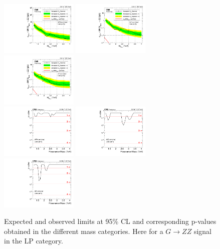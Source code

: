 \begin{figure}[h!]
\centering
\includegraphics[width=0.327\textwidth]{figures/analysis/search1/AN-15-211/limits/brazilianFlag_BulkZZ_WWLP_13TeV_wPDF.pdf}
\includegraphics[width=0.327\textwidth]{figures/analysis/search1/AN-15-211/limits/brazilianFlag_BulkZZ_WZLP_13TeV_wPDF.pdf}
\includegraphics[width=0.327\textwidth]{figures/analysis/search1/AN-15-211/limits/brazilianFlag_BulkZZ_ZZLP_13TeV_wPDF.pdf}\\
\includegraphics[width=0.327\textwidth]{figures/analysis/search1/AN-15-211/pvalues/pvalue_BulkZZinWW_low_purity.pdf}
\includegraphics[width=0.327\textwidth]{figures/analysis/search1/AN-15-211/pvalues/pvalue_BulkZZinWZ_low_purity.pdf}
\includegraphics[width=0.327\textwidth]{figures/analysis/search1/AN-15-211/pvalues/pvalue_BulkZZinZZ_low_purity.pdf}
\caption{Expected and observed limits at 95\% CL and corresponding p-values obtained in the different mass categories. Here for a $G\rightarrow ZZ$ signal in the LP category.}
\label{fig:app:Limits_LPBulkZZ}
\end{figure}
